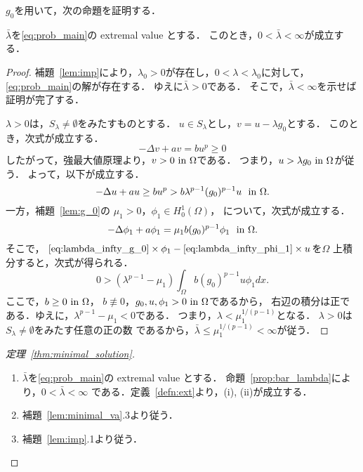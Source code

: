$g_0$を用いて，次の命題を証明する．

\begin{prop} \label{prop:bar_lambda}
 $\bar{\lambda}$を\ref{eq:prob_main}の extremal value とする．
 このとき，$0 < \bar{\lambda} < \infty$が成立する．
\end{prop}

\begin{proof}
補題~\ref{lem:imp}により，$\lambda_0 > 0$が存在し，$0 < \lambda <
 \lambda_0$に対して，\ref{eq:prob_main}の解が存在する．
ゆえに$\bar{\lambda} > 0$である．
そこで，$\bar{\lambda} < \infty$を示せば証明が完了する．

$\lambda > 0$は，$S_\lambda \neq \emptyset$をみたすものとする．
$u \in S_\lambda$とし，$v = u - \lambda g_0$とする．
このとき，次式が成立する．
\[
 -\Delta v + av = bu^p \geq 0
\]
したがって，強最大値原理より，$v > 0 ~\text{in}~ \Omega$である．
つまり，$u > \lambda g_0 ~\text{in}~ \Omega$が従う．
よって，以下が成立する．
\begin{equation}
 - \Delta u + au \geq bu^p > b \lambda^{p-1} (g_0)^{p-1} u \ \ \text{in}~
  \Omega. \label{eq:lambda_infty_g_0} 
\end{equation}
 一方，補題~\ref{lem:g_0}の
 $\mu_1 > 0$，$\phi_1 \in H_0^1(\Omega)$，
 について，次式が成立する．
\begin{equation}
 -\Delta \phi_1 + a \phi_1 = \mu_1 b (g_0)^{p-1} \phi_1 \ \ \text{in}~ \Omega. 
  \label{eq:lambda_infty_phi_1} 
\end{equation}
 そこで，
 $\text{\eqref{eq:lambda_infty_g_0}} \times \phi_1 - 
 \text{\eqref{eq:lambda_infty_phi_1}} \times u $を$\Omega$
 上積分すると，次式が得られる．
 \[
  0 > (\lambda^{p-1} - \mu_1) \int_\Omega b(g_0)^{p-1} u \phi_1 dx.
 \]
 ここで，$b \geq 0 ~\text{in}~ \Omega$，
 $b \not \equiv 0$，$g_0, u, \phi_1 > 0 ~\text{in}~ \Omega$であるから，
 右辺の積分は正である．ゆえに，$\lambda^{p-1} - \mu_1 < 0$である．
 つまり，$\lambda < \mu_1^{1/(p-1)}$となる．
 $\lambda > 0$は$S_\lambda \neq \emptyset$をみたす任意の正の数
 であるから，$\bar{\lambda} \leq \mu_1 ^{1/(p-1)} < \infty$が従う．
 \qedhere
\end{proof}

\begin{proof}[定理~\ref{thm:minimal_solution}]
 \begin{enumerate}[1.] \sage
  \item $\bar{\lambda}$を\ref{eq:prob_main}の extremal value とする．
        命題~\ref{prop:bar_lambda}により，$0 < \bar{\lambda} < \infty$
        である．定義~\ref{defn:ext}より，(i), (ii)が成立する．
  \item 補題~\ref{lem:minimal_va}.3より従う．
  \item 補題~\ref{lem:imp}.1より従う． \qedhere
 \end{enumerate}
\end{proof}

